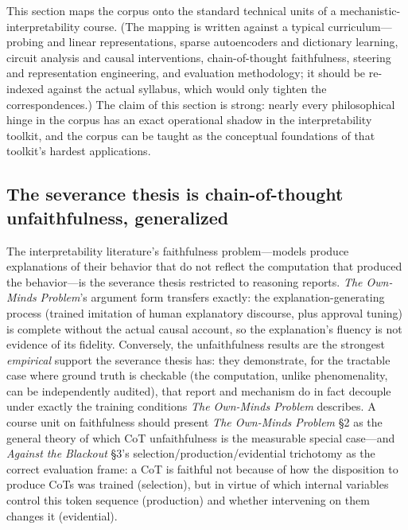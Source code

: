 \documentclass[11pt]{article}
\newcommand{\OM}{\emph{The Own-Minds Problem}}
\newcommand{\AB}{\emph{Against the Blackout}}
\begin{document}
This section maps the corpus onto the standard technical units of a mechanistic-interpretability course. (The mapping is written against a typical curriculum---probing and linear representations, sparse autoencoders and dictionary learning, circuit analysis and causal interventions, chain-of-thought faithfulness, steering and representation engineering, and evaluation methodology; it should be re-indexed against the actual syllabus, which would only tighten the correspondences.) The claim of this section is strong: nearly every philosophical hinge in the corpus has an exact operational shadow in the interpretability toolkit, and the corpus can be taught as the conceptual foundations of that toolkit's hardest applications.

\subsection{The severance thesis is chain-of-thought unfaithfulness, generalized}
The interpretability literature's faithfulness problem---models produce explanations of their behavior that do not reflect the computation that produced the behavior---is the severance thesis restricted to reasoning reports. \OM{}'s argument form transfers exactly: the explanation-generating process (trained imitation of human explanatory discourse, plus approval tuning) is complete without the actual causal account, so the explanation's fluency is not evidence of its fidelity. Conversely, the unfaithfulness results are the strongest \emph{empirical} support the severance thesis has: they demonstrate, for the tractable case where ground truth is checkable (the computation, unlike phenomenality, can be independently audited), that report and mechanism do in fact decouple under exactly the training conditions \OM{} describes. A course unit on faithfulness should present \OM{} \S 2 as the general theory of which CoT unfaithfulness is the measurable special case---and \AB{} \S 3's selection/production/evidential trichotomy as the correct evaluation frame: a CoT is faithful not because of how the disposition to produce CoTs was trained (selection), but in virtue of which internal variables control this token sequence (production) and whether intervening on them changes it (evidential).
\end{document}
